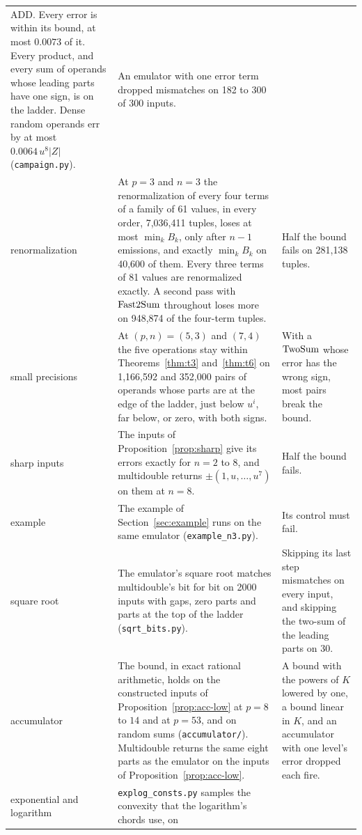 \begin{table}[tp]
\begin{tabular}{@{}>{\raggedright\arraybackslash}p{}>{\raggedright\arraybackslash}p{}>{\raggedright\arraybackslash}p{}@{}}
ADD. Every error is within its bound, at most $0.0073$ of it. Every product, and every sum of operands whose leading
parts have one sign, is on the ladder. Dense random operands err by at most $0.0064\,u^8|Z|$ (\texttt{campaign.py}). &
An emulator with one error term dropped mismatches on 182 to 300 of 300 inputs. \\ \addlinespace
renormalization & At $p = 3$ and $n = 3$ the renormalization of every four terms of a family of 61 values, in every
order, 7,036,411 tuples, loses at most $\min_k B_k$, only after $n - 1$ emissions, and exactly $\min_k B_k$ on 40,600
of them. Every three terms of 81 values are renormalized exactly. A second pass with $\mathrm{Fast2Sum}$ throughout loses
more on 948,874 of the four-term tuples. & Half the bound fails on 281,138 tuples. \\ \addlinespace
small precisions & At $(p, n) = (5, 3)$ and $(7, 4)$ the five operations stay within Theorems~\ref{thm:t3}
and~\ref{thm:t6} on 1,166,592 and 352,000 pairs of operands whose parts are at the edge of the ladder, just below
$u^i$, far below, or zero, with both signs. & With a $\mathrm{TwoSum}$ whose error has the wrong sign, most pairs break the
bound. \\ \addlinespace
sharp inputs & The inputs of Proposition~\ref{prop:sharp} give its errors exactly for $n = 2$ to $8$, and multidouble
returns $\pm(1, u, \dots, u^7)$ on them at $n = 8$. & Half the bound fails. \\ \addlinespace
example & The example of Section~\ref{sec:example} runs on the same emulator (\texttt{example\_n3.py}). & Its control
must fail. \\ \addlinespace
square root & The emulator's square root matches multidouble's bit for bit on 2000 inputs with gaps, zero parts and
parts at the top of the ladder (\texttt{sqrt\_bits.py}). & Skipping its last step mismatches on every input, and
skipping the two-sum of the leading parts on 30. \\ \addlinespace
accumulator & The bound, in exact rational arithmetic, holds on the constructed inputs of
Proposition~\ref{prop:acc-low} at $p = 8$ to $14$ and at $p = 53$, and on random sums (\texttt{accumulator/}).
Multidouble returns the same eight parts as the emulator on the inputs of Proposition~\ref{prop:acc-low}. & A bound
with the powers of $K$ lowered by one, a bound linear in $K$, and an accumulator with one level's error dropped each
fire. \\ \addlinespace
exponential and logarithm & \texttt{explog\_consts.py} samples the convexity that the logarithm's chords use, on

\end{tabular}
\end{table}
